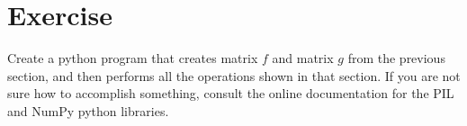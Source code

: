 \section{Exercise}

Create a python program that creates matrix $f$ and matrix $g$ from the 
previous section, and then performs all the operations shown in that section. 
If you are not sure how to accomplish something, consult the online 
documentation for the PIL and NumPy python libraries. 
